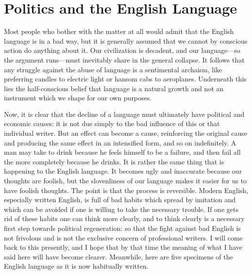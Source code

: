 
\author{George Orwell}
\chapter[George Orwell -- Politics and the English Language]{Politics
and the English Language}



Most people who bother with the matter at all would admit
that the English language is in a bad way, but it is generally assumed
that we cannot by conscious action do anything about it. Our
civilization is decadent, and our language---so the argument
runs---must inevitably share in the general collapse. It follows that
any struggle against the abuse of language is a sentimental archaism,
like preferring candles to electric light or hansom cabs  to
aeroplanes. Underneath this lies the half-conscious belief that
language is a natural growth and not an instrument which we shape for
our own purposes.

Now, it is clear that the decline of a language must ultimately have
political and economic causes: it is not due simply to the bad
influence of this or that individual writer. But an effect can become
a cause, reinforcing the original cause and producing the same effect
in an intensified form, and so on indefinitely. A man may take to
drink because he feels himself to be a failure, and then fail all the
more completely because he drinks. It is rather the same thing that is
happening to the English language. It becomes ugly and inaccurate
because our thoughts are foolish, but the slovenliness of our language
makes it easier for us to have foolish thoughts. The point is that the
process is reversible. Modern English, especially written English, is
full of bad habits which spread by imitation and which can be avoided
if one is willing to take the necessary trouble. If one gets rid of
these habits one can think more clearly, and to think clearly is a
necessary first step towards political regeneration: so that the fight
against bad English is not frivolous and is not the exclusive concern
of professional writers. I will come back to this presently, and I
hope that by that time the meaning of what I have said here will have
become clearer. Meanwhile, here are five specimens of the English
language as it is now habitually written.

